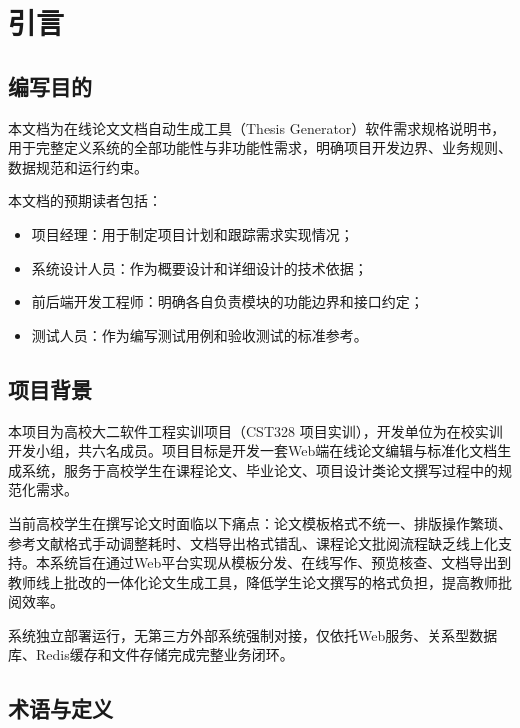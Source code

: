 
\section{引言}

\subsection{编写目的}

本文档为在线论文文档自动生成工具（Thesis Generator）软件需求规格说明书，用于完整定义系统的全部功能性与非功能性需求，明确项目开发边界、业务规则、数据规范和运行约束。

本文档的预期读者包括：
\begin{itemize}
    \item 项目经理：用于制定项目计划和跟踪需求实现情况；
    \item 系统设计人员：作为概要设计和详细设计的技术依据；
    \item 前后端开发工程师：明确各自负责模块的功能边界和接口约定；
    \item 测试人员：作为编写测试用例和验收测试的标准参考。
\end{itemize}

\subsection{项目背景}

本项目为高校大二软件工程实训项目（CST328 项目实训），开发单位为在校实训开发小组，共六名成员。项目目标是开发一套Web端在线论文编辑与标准化文档生成系统，服务于高校学生在课程论文、毕业论文、项目设计类论文撰写过程中的规范化需求。

当前高校学生在撰写论文时面临以下痛点：论文模板格式不统一、排版操作繁琐、参考文献格式手动调整耗时、文档导出格式错乱、课程论文批阅流程缺乏线上化支持。本系统旨在通过Web平台实现从模板分发、在线写作、预览核查、文档导出到教师线上批改的一体化论文生成工具，降低学生论文撰写的格式负担，提高教师批阅效率。

系统独立部署运行，无第三方外部系统强制对接，仅依托Web服务、关系型数据库、Redis缓存和文件存储完成完整业务闭环。

\subsection{术语与定义}

